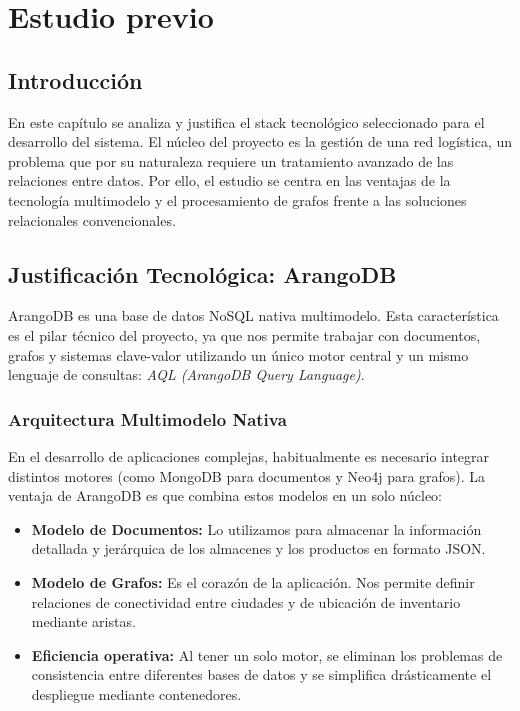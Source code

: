 \chapter{Estudio previo}\label{cap:estudio_previo}

\section{Introducción}
En este capítulo se analiza y justifica el stack tecnológico seleccionado para el desarrollo del sistema. El núcleo del proyecto es la gestión de una red logística, un problema que por su naturaleza requiere un tratamiento avanzado de las relaciones entre datos. Por ello, el estudio se centra en las ventajas de la tecnología multimodelo y el procesamiento de grafos frente a las soluciones relacionales convencionales.

\section{Justificación Tecnológica: ArangoDB}
ArangoDB es una base de datos NoSQL nativa multimodelo. Esta característica es el pilar técnico del proyecto, ya que nos permite trabajar con documentos, grafos y sistemas clave-valor utilizando un único motor central y un mismo lenguaje de consultas: \textit{AQL (ArangoDB Query Language)}.

\subsection{Arquitectura Multimodelo Nativa}
En el desarrollo de aplicaciones complejas, habitualmente es necesario integrar distintos motores (como MongoDB para documentos y Neo4j para grafos). La ventaja de ArangoDB es que combina estos modelos en un solo núcleo:
\begin{itemize}
    \item \textbf{Modelo de Documentos:} Lo utilizamos para almacenar la información detallada y jerárquica de los almacenes y los productos en formato JSON.
    \item \textbf{Modelo de Grafos:} Es el corazón de la aplicación. Nos permite definir relaciones de conectividad entre ciudades y de ubicación de inventario mediante aristas.
    \item \textbf{Eficiencia operativa:} Al tener un solo motor, se eliminan los problemas de consistencia entre diferentes bases de datos y se simplifica drásticamente el despliegue mediante contenedores.
\end{itemize}

